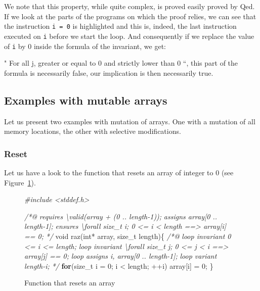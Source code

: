 \documentclass[12pt,francais,]{scrbook}
\newenvironment{Shaded}{}{}
\newcommand{\KeywordTok}[1]{\textcolor[rgb]{0.00,0.44,0.13}{\textbf{{#1}}}}
\newcommand{\DataTypeTok}[1]{\textcolor[rgb]{0.56,0.13,0.00}{{#1}}}
\newcommand{\DecValTok}[1]{\textcolor[rgb]{0.25,0.63,0.44}{{#1}}}
\newcommand{\CommentTok}[1]{\textcolor[rgb]{0.38,0.63,0.69}{\textit{{#1}}}}
\newcommand{\NormalTok}[1]{{#1}}
\begin{document}
We note that this property, while quite complex, is proved easily proved
by Qed. If we look at the parts of the programs on which the proof
relies, we can see that the instruction \texttt{i\ =\ 0} is highlighted
and this is, indeed, the last instruction executed on \texttt{i} before
we start the loop. And consequently if we replace the value of
\texttt{i} by 0 inside the formula of the invariant, we get:

" For all j, greater or equal to 0 and strictly lower than 0 ``, this
part of the formula is necessarily false, our implication is then
necessarily true.

\subsection{Examples with mutable
arrays}\label{examples-with-mutable-arrays}

Let us present two examples with mutation of arrays. One with a mutation
of all memory locations, the other with selective modifications.

\subsubsection{Reset}\label{reset}

Let us have a look to the function that resets an array of integer to 0
(see Figure~\ref{fig:4-4-2-1-raz}).

\begin{figure}[htbp]
  \centering
\begin{footnotesize}\begin{Shaded}
\begin{Highlighting}[]
\CommentTok{#include <stddef.h>}

\CommentTok{/*@}
\CommentTok{  requires \textbackslash{}valid(array + (0 .. length-1));}
\CommentTok{  assigns  array[0 .. length-1];}
\CommentTok{  ensures  \textbackslash{}forall size_t i; 0 <= i < length ==> array[i] == 0;}
\CommentTok{*/}
\DataTypeTok{void} \NormalTok{raz(}\DataTypeTok{int}\NormalTok{* array, size_t length)\{}
  \CommentTok{/*@}
\CommentTok{    loop invariant 0 <= i <= length;}
\CommentTok{    loop invariant \textbackslash{}forall size_t j; 0 <= j < i ==> array[j] == 0;}
\CommentTok{    loop assigns i, array[0 .. length-1];}
\CommentTok{    loop variant length-i;}
\CommentTok{  */}
  \KeywordTok{for}\NormalTok{(size_t i = }\DecValTok{0}\NormalTok{; i < length; ++i)}
    \NormalTok{array[i] = }\DecValTok{0}\NormalTok{;}
\NormalTok{\}}
\end{Highlighting}
\end{Shaded}\end{footnotesize}
\caption{Function that resets an array}
\label{fig:4-4-2-1-raz}
\end{figure}
\end{document}
